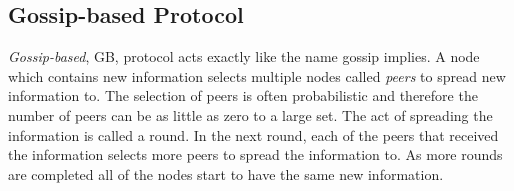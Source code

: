 \documentclass{sig-alternate}
\begin{document}
\subsection{Gossip-based Protocol}
\label{sec:GBP}

\emph{Gossip-based}, GB, protocol acts exactly like the name gossip implies. A node which contains new information selects multiple nodes called \emph{peers} to spread new information to. The selection of peers is often probabilistic and therefore the number of peers can be as little as zero to a large set. The act of spreading the information is called a round. In the next round, each of the peers that received the information selects more peers to spread the information to. As more rounds are completed all of the nodes start to have the same new information.~\cite{Yanggratoke}














\end{document}
